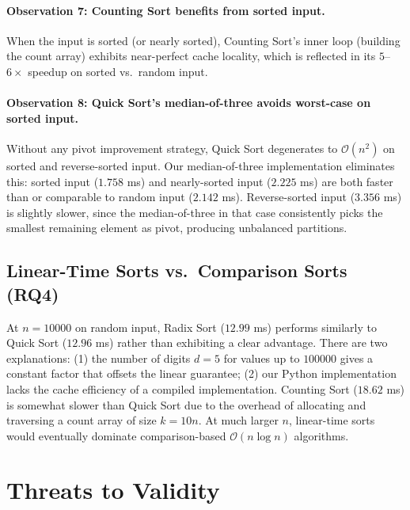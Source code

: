 \documentclass[11pt,a4paper]{article}
\begin{document}
\paragraph{Observation 7: Counting Sort benefits from sorted input.}
When the input is sorted (or nearly sorted), Counting Sort's inner loop (building the
count array) exhibits near-perfect cache locality, which is reflected in its
$5$--$6\times$ speedup on sorted vs.\ random input.

\paragraph{Observation 8: Quick Sort's median-of-three avoids worst-case on sorted input.}
Without any pivot improvement strategy, Quick Sort degenerates to $\mathcal{O}(n^2)$
on sorted and reverse-sorted input. Our median-of-three implementation eliminates this:
sorted input ($1.758$ ms) and nearly-sorted input ($2.225$ ms) are both faster than or
comparable to random input ($2.142$ ms). Reverse-sorted input ($3.356$ ms) is slightly
slower, since the median-of-three in that case consistently picks the smallest remaining
element as pivot, producing unbalanced partitions.

\subsection{Linear-Time Sorts vs.\ Comparison Sorts (RQ4)}

At $n = 10000$ on random input, Radix Sort ($12.99$ ms) performs similarly to Quick
Sort ($12.96$ ms) rather than exhibiting a clear advantage.
There are two explanations: (1) the number of digits $d = 5$ for values up to $100000$
gives a constant factor that offsets the linear guarantee; (2) our Python implementation
lacks the cache efficiency of a compiled implementation.
Counting Sort ($18.62$ ms) is somewhat slower than Quick Sort due to the overhead of
allocating and traversing a count array of size $k = 10n$.
At much larger $n$, linear-time sorts would eventually dominate comparison-based
$\mathcal{O}(n\log n)$ algorithms.

\section{Threats to Validity}
\label{sec:threats}
\end{document}
